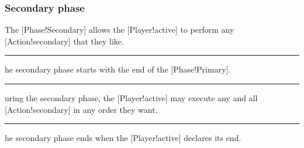 \subsubsection{Secondary phase}

The [Phase!Secondary] allows the [Player!active] to perform any [Action!secondary] that they like.

\begin{rules}
    \rule{phase.secondary.start} The secondary phase starts with the end of the [Phase!Primary].
    \rule{phase.secondary.privilege} During the secondary phase, the [Player!active] may execute any and all [Action!secondary] in any order they want.
    \rule{phase.secondary.end} The secondary phase ends when the [Player!active] declares its end.
\end{rules}